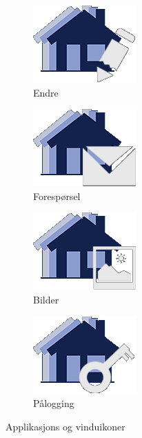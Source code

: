 \begin{figure}[ht!]
\begin{subfigure}[b]{0.2\textwidth}
\end{subfigure}
\quad
\begin{subfigure}[b]{0.2\textwidth}
\centering
\includegraphics[scale=0.4]{./img/produktdokumentasjon/visuelle_detaljer/edit.png}
\caption{Endre}
\end{subfigure}
\quad
\begin{subfigure}[b]{0.2\textwidth}
\centering
\includegraphics[scale=0.4]{./img/produktdokumentasjon/visuelle_detaljer/foresporsel.png}
\caption{Forespørsel}
\end{subfigure}
\quad
\begin{subfigure}[b]{0.2\textwidth}
\centering
\includegraphics[scale=0.4]{./img/produktdokumentasjon/visuelle_detaljer/bildevindu.png}
\caption{Bilder}
\end{subfigure}
\quad
\begin{subfigure}[b]{0.2\textwidth}
\centering
\includegraphics[scale=0.4]{./img/produktdokumentasjon/visuelle_detaljer/passord.png}
\caption{Pålogging}
\end{subfigure}
\quad
\caption{Applikasjons og vinduikoner}\label{fig:appikoner}
\end{figure}


